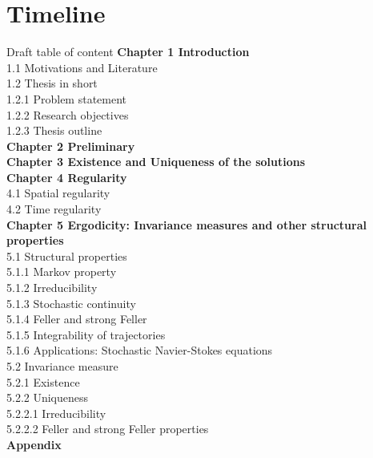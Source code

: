 \documentclass[xcolor=dvipsnames,leqno]{beamer}
\begin{document}
\section[]{Timeline}
\begin{frame}[shrink]{Draft table of content}
	\textbf{Chapter 1 		Introduction}\\
	1.1  Motivations and Literature\\
	1.2  Thesis in short\\
	\hspace*{1cm}	 1.2.1  Problem statement\\
	\hspace*{1cm}	 1.2.2  Research objectives\\  
	\hspace*{1cm}	 1.2.3  Thesis outline\\

	\textbf{Chapter 2		Preliminary}	\\

	\textbf{Chapter 3		Existence and Uniqueness of the solutions}	\\

	\textbf{Chapter 4		Regularity}\\
	4.1		Spatial regularity\\   
	4.2		Time regularity\\       

	\textbf{Chapter 5		Ergodicity: Invariance measures and other structural properties}\\
	5.1		Structural properties\\
	\hspace*{1cm}	 5.1.1	Markov property\\
	\hspace*{1cm}	 5.1.2	Irreducibility\\
	\hspace*{1cm}	 5.1.3  Stochastic continuity\\
	\hspace*{1cm}    5.1.4  Feller and strong Feller\\
	\hspace*{1cm}    5.1.5  Integrability of trajectories\\
	\hspace*{1cm}    5.1.6  Applications: Stochastic Navier-Stokes equations\\ %
	5.2		Invariance measure\\
	\hspace*{1cm}	 5.2.1	Existence\\
	\hspace*{1cm}	 5.2.2	Uniqueness\\
	\hspace*{2cm}	 	 5.2.2.1  Irreducibility\\
	\hspace*{2cm}  		 5.2.2.2  Feller and strong Feller properties\\
	
   
\textbf{Appendix}		    
\end{frame}   
\end{document}
